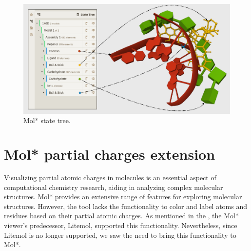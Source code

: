 \documentclass[
  digital,     %
  oneside,     %
  nosansbold,  %
  nocolorbold, %
  lof,         %
  lot,         %
]{fithesis4}
\begin{document}

\begin{figure}[htbp]
  \begin{center}
    \includegraphics[width=\textwidth]{figures/state_tree.png}
  \end{center}
  \caption{Mol* state tree.}
  \label{fig:state_tree}
\end{figure}

\clearpage
\newpage

\chapter{Mol* partial charges extension}
\label{chapter:molstar_partial_charges_extension}

Visualizing partial atomic charges in molecules is an essential aspect of computational chemistry research, aiding in analyzing complex molecular structures. Mol* provides an extensive range of features for exploring molecular structures. However, the tool lacks the functionality to color and label atoms and residues based on their partial atomic charges. As mentioned in the , the Mol* viewer’s predecessor, Litemol, supported this functionality. Nevertheless, since Litemol is no longer supported, we saw the need to bring this functionality to Mol*.
\end{document}
